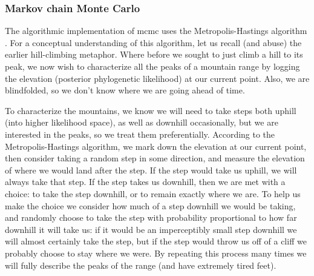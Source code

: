 \subsubsection{Markov chain Monte Carlo}
The algorithmic implementation of \gls{mcmc} uses the Metropolis-Hastings algorithm \citep{metropolis1953equation,hastings1970monte}.
For a conceptual understanding of this algorithm, let us recall (and abuse) the earlier hill-climbing metaphor.
Where before we sought to just climb a hill to its peak, we now wish to characterize all the peaks of a mountain range by logging the elevation (posterior phylogenetic likelihood) at our current point.
Also, we are blindfolded, so we don't know where we are going ahead of time.

To characterize the mountains, we know we will need to take steps both uphill (into higher likelihood space), as well as downhill occasionally, but we are interested in the peaks, so we treat them preferentially.
According to the Metropolis-Hastings algorithm, we mark down the elevation at our current point, then consider taking a random step in some direction, and measure the elevation of where we would land after the step.
If the step would take us uphill, we will always take that step.
If the step takes us downhill, then we are met with a choice: to take the step downhill, or to remain exactly where we are.
To help us make the choice we consider how much of a step downhill we would be taking, and randomly choose to take the step with probability proportional to how far downhill it will take us: if it would be an imperceptibly small step downhill we will almost certainly take the step, but if the step would throw us off of a cliff we probably choose to stay where we were.
By repeating this process many times we will fully describe the peaks of the range (and have extremely tired feet).

